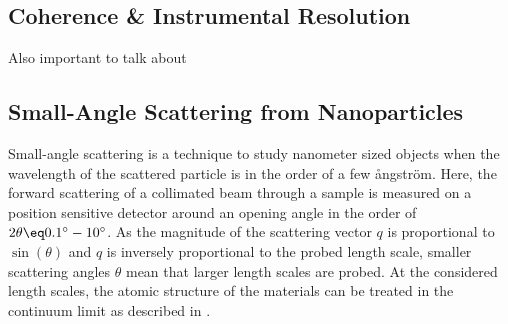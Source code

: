 \documentclass[\main/dresen_thesis.tex]{subfiles}
\begin{document}
\subsection{Coherence \& Instrumental Resolution}\label{sec:theoreticalBackground:scattering:CoherenceInstrumentalResolution}
Also important to talk about

\subsection{Small-Angle Scattering from Nanoparticles}\label{sec:theoreticalBackground:scattering:SASNanoparticles}
Small-angle scattering is a technique to study nanometer sized objects when the wavelength of the scattered particle is in the order of a few {\aa}ngstr\"om.
Here, the forward scattering of a collimated beam through a sample is measured on a position sensitive detector around an opening angle in the order of $2 \theta \eq 0.1^\circ - 10^\circ$.
As the magnitude of the scattering vector $q$ is proportional to $\sin(\theta)$ and $q$ is inversely proportional to the probed length scale, smaller scattering angles $\theta$ mean that larger length scales are probed.
At the considered length scales, the atomic structure of the materials can be treated in the continuum limit as described in .
\end{document}
